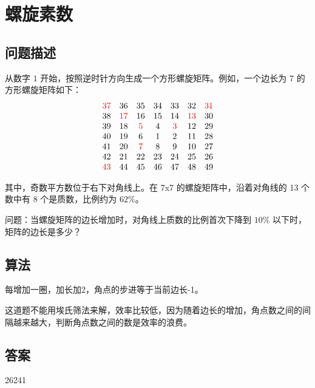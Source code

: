 \section{螺旋素数}
\subsection{问题描述}
\begin{tcolorbox}
	从数字 $1$ 开始，按照逆时针方向生成一个方形螺旋矩阵。例如，一个边长为 7 的方形螺旋矩阵如下：
	\[
		\begin{matrix}
			\textcolor{red}{37} & 36       & 35      & 34 & 33      & 32       & \textcolor{red}{31} \\
			38       & \textcolor{red}{17} & 16      & 15 & 14      & \textcolor{red}{13} & 30       \\
			39       & 18       & \textcolor{red}{5} & 4  & \textcolor{red}{3} & 12       & 29       \\
			40       & 19       & 6       & 1  & 2       & 11       & 28       \\
			41       & 20       & \textcolor{red}{7} & 8  & 9       & 10       & 27       \\
			42       & 21       & 22      & 23 & 24      & 25       & 26       \\
			\textcolor{red}{43} & 44       & 45      & 46 & 47      & 48       & 49       \\
		\end{matrix}
	\]

	其中，奇数平方数位于右下对角线上。在 7x7 的螺旋矩阵中，沿着对角线的 13 个数中有 8 个是质数，比例约为 $62\%$。

	问题：当螺旋矩阵的边长增加时，对角线上质数的比例首次下降到 $10\%$ 以下时，矩阵的边长是多少？
\end{tcolorbox}

\subsection{算法}
每增加一圈，加长加2，角点的步进等于当前边长-1。

这道题不能用埃氏筛法来解，效率比较低，因为随着边长的增加，角点数之间的间隔越来越大，判断角点数之间的数是效率的浪费。

\subsection{答案}
26241
